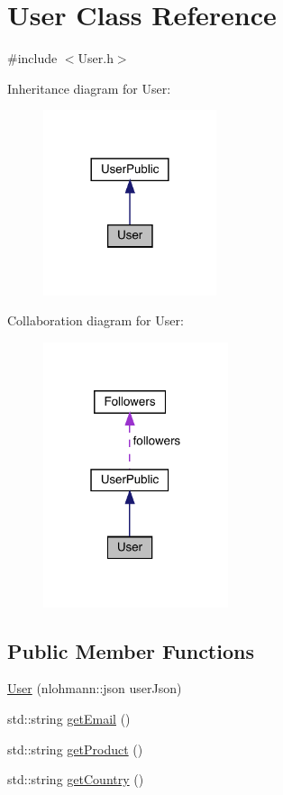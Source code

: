 \hypertarget{class_user}{}\section{User Class Reference}
\label{class_user}


{\ttfamily \#include $<$User.\+h$>$}



Inheritance diagram for User\+:
\nopagebreak
\begin{figure}[H]
\begin{center}
\leavevmode
\includegraphics[width=144pt]{class_user__inherit__graph}
\end{center}
\end{figure}


Collaboration diagram for User\+:
\nopagebreak
\begin{figure}[H]
\begin{center}
\leavevmode
\includegraphics[width=154pt]{class_user__coll__graph}
\end{center}
\end{figure}
\subsection*{Public Member Functions}
\begin{DoxyCompactItemize}
\item 
\mbox{\hyperlink{class_user_a75e2d36bce1933dcb0b9678bc2f0f0cf}{User}} (nlohmann\+::json user\+Json)
\item 
std\+::string \mbox{\hyperlink{class_user_a7e15815ed9167b628dec1d751c9708df}{get\+Email}} ()
\item 
std\+::string \mbox{\hyperlink{class_user_a0df460dd033b08558b219df27168b87f}{get\+Product}} ()
\item 
std\+::string \mbox{\hyperlink{class_user_a1e3ff9d405c551739d14994463b2f7f6}{get\+Country}} ()
\end{DoxyCompactItemize}
